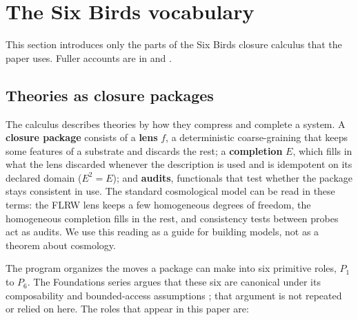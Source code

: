 \hypertarget{the-six-birds-vocabulary}{%
\section{The Six Birds vocabulary}\label{the-six-birds-vocabulary}}

This section introduces only the parts of the Six Birds closure calculus
that the paper uses. Fuller accounts are in \citep{TsiokosSixBirds2026}
and \citep{TsiokosFoundations2026}.

\hypertarget{theories-as-closure-packages}{%
\subsection{Theories as closure
packages}\label{theories-as-closure-packages}}

The calculus describes theories by how they compress and complete a
system. A \textbf{closure package} consists of a \textbf{lens} \(f\), a
deterministic coarse-graining that keeps some features of a substrate
and discards the rest; a \textbf{completion} \(E\), which fills in what
the lens discarded whenever the description is used and is idempotent on
its declared domain (\(E^2=E\)); and \textbf{audits}, functionals that
test whether the package stays consistent in use. The standard
cosmological model can be read in these terms: the FLRW lens keeps a few
homogeneous degrees of freedom, the homogeneous completion fills in the
rest, and consistency tests between probes act as audits. We use this
reading as a guide for building models, not as a theorem about
cosmology.

The program organizes the moves a package can make into six primitive
roles, \(P_1\) to \(P_6\). The Foundations series argues that these six
are canonical under its composability and bounded-access assumptions
\citep{TsiokosFoundations2026}; that argument is not repeated or relied
on here. The roles that appear in this paper are:

